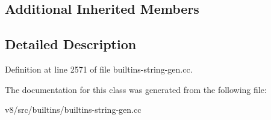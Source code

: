 \subsection*{Additional Inherited Members}


\subsection{Detailed Description}


Definition at line 2571 of file builtins-\/string-\/gen.\+cc.



The documentation for this class was generated from the following file\+:\begin{DoxyCompactItemize}
\item 
v8/src/builtins/builtins-\/string-\/gen.\+cc\end{DoxyCompactItemize}
